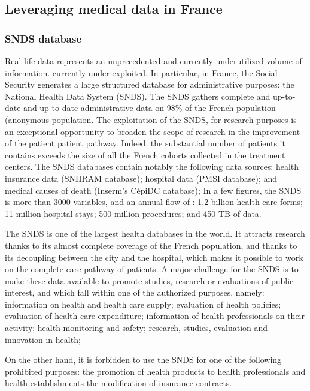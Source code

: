 \subsection{Leveraging medical data in France}

\subsubsection{SNDS database}


Real-life data represents an unprecedented and currently underutilized volume of
information. currently under-exploited. In particular, in France, the Social
Security generates a large structured database for administrative purposes: the
National Health Data System (SNDS). The SNDS gathers complete and up-to-date and
up to date administrative data on 98\% of the French population (anonymous
population. The exploitation of the SNDS, for research purposes is an
exceptional opportunity to broaden the scope of research in the improvement of
the patient patient pathway. Indeed, the substantial number of patients it
contains exceeds the size of all the French cohorts collected in the treatment
centers.
The SNDS databases contain notably the following data sources:
health insurance data (SNIIRAM database);
hospital data (PMSI database);
and medical causes of death (Inserm's CépiDC database);
In a few figures, the SNDS is more than 3000 variables, and an annual flow of :
1.2 billion health care forms; 11 million hospital stays; 500 million
procedures; and 450 TB of data.

The SNDS is one of the largest health databases in the world. It attracts
research thanks to its almost complete coverage of the French population, and
thanks to its decoupling between the city and the hospital, which
makes it possible to work on the complete care pathway of patients. A major
challenge for the SNDS is to make these data available to promote studies,
research or evaluations of public interest, and which fall within one of the
authorized purposes, namely:
information on health and health care supply;
evaluation of health policies;
evaluation of health care expenditure;
information of health professionals on their activity;
health monitoring and safety;
research, studies, evaluation and innovation in health;

On the other hand, it is forbidden to use the SNDS for one of the following
prohibited purposes: the promotion of health products to health professionals
and health establishments the modification of insurance contracts.

